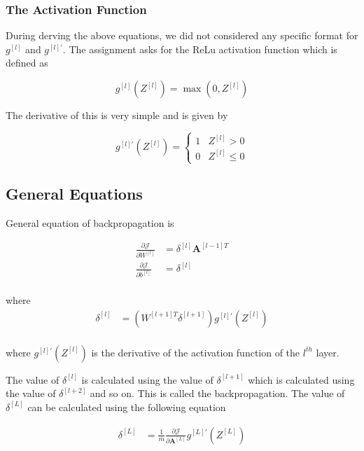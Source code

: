 \documentclass[12pt]{article}
\begin{document}
\subsubsection{The Activation Function}
During derving the above equations, we did not considered any specific format for $g^{[l]}$ and $g^{[l]'}$. The assignment asks for the ReLu activation function which is defined as

$$
    g^{[l]}(Z^{[l]}) = \max \left(0, Z^{[l]}\right)
$$

The derivative of this is very simple and is given by

$$
    g^{[l]'}(Z^{[l]}) = \begin{cases}
        1 & Z^{[l]} > 0    \\
        0 & Z^{[l]} \leq 0
    \end{cases}
$$

\subsection{General Equations}

General equation of backpropagation is

$$
    \begin{aligned}
        \frac{\partial \mathcal{J}}{\partial W^{[l]}} & = \delta^{[l]} \mathbf{A}^{[l-1] T} \\
        \frac{\partial \mathcal{J}}{\partial b^{[l]}} & = \delta^{[l]}                      \\
    \end{aligned}
$$

where
$$
    \begin{aligned}
        \delta^{[l]} & = (W^{[l+1] T} \delta^{[l+1]})  g^{[l]'}(Z^{[l]}) \\
    \end{aligned}
$$

where $g^{[l]'}(Z^{[l]})$ is the derivative of the activation function of the $l^{th}$ layer.

The value of $\delta^{[l]}$ is calculated using the value of $\delta^{[l+1]}$ which is calculated using the value of $\delta^{[l+2]}$ and so on. This is called the backpropagation. The value of $\delta^{[L]}$ can be calculated using the following equation

$$
    \begin{aligned}
        \delta^{[L]} & = \frac{1}{m} \frac{\partial \mathcal{J}}{\partial \mathbf{A}^{[L]}}  g^{[L]'}(Z^{[L]}) \\
    \end{aligned}
$$
\end{document}
